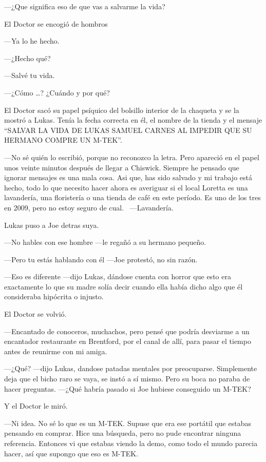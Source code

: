 ---¿Que significa eso de que vas a salvarme la vida?

El Doctor se encogió de hombros

---Ya lo he hecho.

---¿Hecho qué?

---Salvé tu vida.

---¿Cómo \ldots{}? ¿Cuándo y por qué?

El Doctor sacó su papel psíquico del bolsillo interior de la chaqueta y
se la mostró a Lukas. Tenía la fecha correcta en él, el nombre de la
tienda y el mensaje ``SALVAR LA VIDA DE LUKAS SAMUEL CARNES AL IMPEDIR
QUE SU HERMANO COMPRE UN M-TEK''.

---No sé quién lo escribió, porque no reconozco la letra. Pero apareció
en el papel unos veinte minutos después de llegar a Chiswick. Siempre he
pensado que ignorar mensajes es una mala cosa. Asi que, has sido salvado
y mi trabajo está hecho, todo lo que necesito hacer ahora es averiguar
si el local Loretta es una lavandería, una floristería o una tienda de
café en este período. Es uno de los tres en 2009, pero no estoy seguro
de cual. ~---Lavandería.

Lukas puso a Joe detras suya.

---No hables con ese hombre ---le regañó a su hermano pequeño.

---Pero tu estás hablando con él ---Joe protestó, no sin razón.

---Eso es diferente ---dijo Lukas, dándose cuenta con horror que esto
era exactamente lo que su madre solía decir cuando ella había dicho algo
que él consideraba hipócrita o injusto.

El Doctor se volvió.

---Encantado de conoceros, muchachos, pero pensé que podría desviarme a
un encantador restaurante en Brentford, por el canal de allí, para pasar
el tiempo antes de reunirme con mi amiga.

---¿Qué? ---dijo Lukas, dandose patadas mentales por preocuparse.
Simplemente deja que el bicho raro se vaya, se instó a sí mismo. Pero su
boca no paraba de hacer preguntas. ---¿Qué habría pasado si Joe hubiese
conseguido un M-TEK?

Y el Doctor le miró.

---Ni idea. No sé lo que es un M-TEK. Supuse que era ese portátil que
estabas pensando en comprar. Hice una búsqueda, pero no pude encontrar
ninguna referencia. Entonces vi que estabas viendo la demo, como todo el
mundo parecia hacer, así que supongo que eso es M-TEK.

